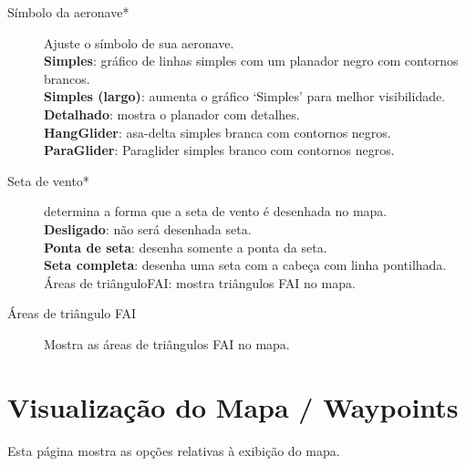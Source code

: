 \begin{description}
\item[Símbolo da aeronave*]  Ajuste o símbolo de sua aeronave. \\
  {\bf Simples}: gráfico de linhas simples com um planador negro com contornos brancos. \\
  {\bf Simples (largo)}: aumenta o gráfico ‘Simples’ para melhor visibilidade. \\
  {\bf Detalhado}: mostra o planador com detalhes. \\
  {\bf HangGlider}: asa-delta simples branca com contornos negros. \\
  {\bf ParaGlider}: Paraglider simples branco com contornos negros.
\item[Seta de vento*]  determina a forma que a seta de vento é desenhada no mapa. \\
  {\bf Desligado}: não será desenhada seta. \\
  {\bf Ponta de seta}: desenha somente a ponta da seta. \\
  {\bf Seta completa}: desenha uma seta com a cabeça com linha pontilhada.  Áreas de triânguloFAI: mostra triângulos FAI no mapa.
\item[Áreas de triângulo FAI] Mostra as áreas de triângulos FAI no mapa.
  
\end{description}


\section{Visualização do Mapa / Waypoints}\label{sec:waypoint-display}

Esta página mostra as opções relativas à exibição do mapa.

